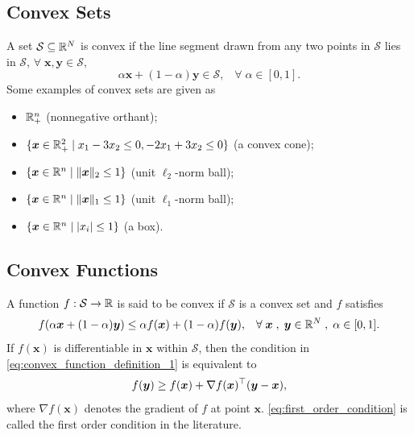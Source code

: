 \subsection{Convex Sets}
A set $\mathcal S \subseteq \mathbb R^N$ is convex if the line segment drawn from any
two points in $\mathcal S$ lies in $\mathcal S$, \ie
$\forall \; \bm x,\bm y \in \mathcal S$,
\begin{equation}
    \alpha \bm x + (1-\alpha) \bm y \in \mathcal S, \;\;\;
    \forall \; \alpha\in[0,1].
\end{equation}
Some examples of convex sets are given as
\begin{itemize}
    \item $\mathbb R^n_+$ (nonnegative orthant);
    \item $\{\bm x \in \mathbb R^2_+ \;|\; x_1 - 3x_2 \leq 0, -2x_1 + 3x_2 \leq 0\}$
          (a convex cone);
    \item $\{\bm x \in \mathbb R^n \;|\; \Vert \bm x \Vert_2 \leq 1\}$ (unit $\ell_2$-norm ball);
    \item $\{\bm x \in \mathbb R^n \;|\; \Vert \bm x \Vert_1 \leq 1\}$ (unit $\ell_1$-norm ball);
    \item $\{\bm x \in \mathbb R^n \;|\; \vert x_i \vert \leq 1\}$ (a box).
\end{itemize}

\subsection{Convex Functions}
A function $f:\mathcal S\rightarrow\mathbb R$ is said to be convex if $\mathcal S$ is
a convex set and $f$ satisfies
\begin{equation}
    f(\alpha \bm x + (1-\alpha) \bm y) \leq
    \alpha f(\bm x) + (1-\alpha) f(\bm y), \;\;\;
    \forall \; \bm x \; , \; \bm y \in \mathbb R^N \; , \; \alpha \in [0,1].
    \label{eq:convex_function_definition_1}
\end{equation}
If $f(\bm x)$ is differentiable in $\bm x$ within $\mathcal S$, then the
condition in \eqref{eq:convex_function_definition_1} is equivalent to
\begin{equation}
    f(\bm y) \geq f(\bm x) + \nabla f(\bm x)^\top (\bm y - \bm x),
    \label{eq:first_order_condition}
\end{equation}
where $\nabla f(\bm x)$ denotes the gradient of $f$ at point $\bm x$.
\eqref{eq:first_order_condition} is called the first order condition in the
literature.

